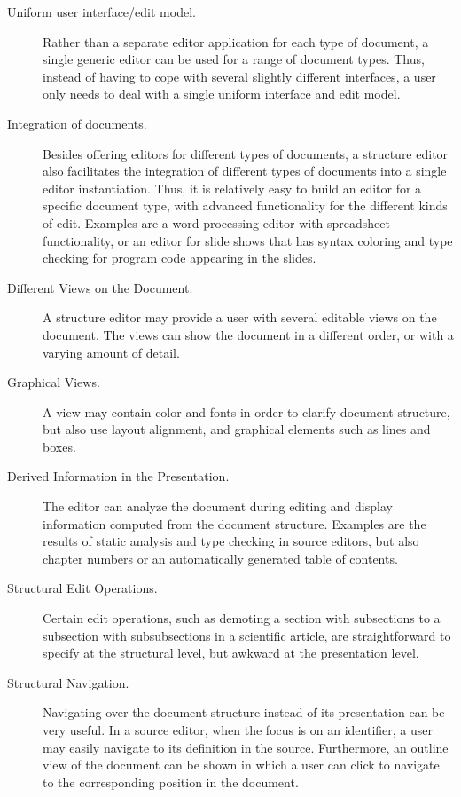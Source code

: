 \documentclass{speauth}
\begin{document}
\begin{description}

\item[Uniform user interface/edit model.] Rather than a separate editor application for each type of document, a single generic editor can be used for a range of document types. Thus, instead of having to cope with several slightly different interfaces, a user only needs to deal with a single uniform interface and edit model.

\item[Integration of documents.] Besides offering editors for different types of documents, a structure editor also facilitates the integration of different types of documents into a single editor instantiation. Thus, it is relatively easy to build an editor for a specific document type, with advanced functionality for the different kinds of edit. Examples are a word-processing editor with spreadsheet functionality, or an editor for slide shows that has syntax coloring and type checking for program code appearing in the slides.

\item[Different Views on the Document.] A structure editor may provide a user with several editable views on the document. The views can show the document in a different order, or with a varying amount of detail. 

\item[Graphical Views.] A view may contain color and fonts in order to clarify document structure, but also use layout alignment, and graphical elements such as lines and boxes.

\item[Derived Information in the Presentation.] The editor can analyze the document during editing and display information computed from the document structure. Examples are the results of static analysis and type checking in source editors, but also chapter numbers or an automatically generated table of contents.

\item[Structural Edit Operations.] Certain edit operations, such as demoting a section with subsections to a subsection with subsubsections in a scientific article, are straightforward to specify at the structural level, but awkward at the presentation level.

\item[Structural Navigation.] Navigating over the document structure instead of its presentation can be very useful. In a source editor, when the focus is on an identifier, a user may easily navigate to its definition in the source. Furthermore, an outline view of the document can be shown in which a user can click to navigate to the corresponding position in the document.


\end{description}
\end{document}
